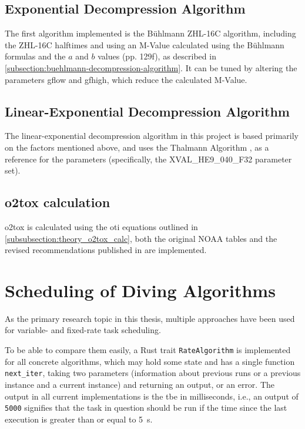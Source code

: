 \subsection{Exponential Decompression Algorithm}
The first algorithm implemented is the Bühlmann ZHL-16C algorithm, including the ZHL-16C halftimes and using an M-Value calculated using the Bühlmann formulas and the $a$ and $b$ values \cite{tauchmedizin-2002} (pp. 129f), as described in \ref{subsection:buehlmann-decompression-algorithm}.
It can be tuned by altering the parameters \gls{gflow} and \gls{gfhigh}, which reduce the calculated M-Value.

\subsection{Linear-Exponential Decompression Algorithm}
The linear-exponential decompression algorithm in this project is based primarily on the factors mentioned above, and uses the Thalmann Algorithm \cite{thalmann-tables-software-2010} \cite{thalmann-parameters-1.3-2020}, as a reference for the parameters (specifically, the XVAL\_HE9\_040\_F32 parameter set).

\subsection{\gls{o2tox} calculation}
\gls{o2tox} is calculated using the \gls{oti} equations outlined in \ref{subsubsection:theory_o2tox_calc}, both the original NOAA tables and the revised recommendations published in \cite{RevisedO2Tox2025} are implemented.

\section{Scheduling of Diving Algorithms}
As the primary research topic in this thesis, multiple approaches have been used for variable- and fixed-rate task scheduling. 

To be able to compare them easily, a Rust trait \lstinline{RateAlgorithm} is implemented for all concrete algorithms, which may hold some state and has a single function \lstinline{next_iter}, taking two parameters (information about previous runs or a previous instance and a current instance) and returning an output, or an error.
The output in all current implementations is the \gls{tbe} in milliseconds, i.e., an output of \lstinline{5000} signifies that the task in question should be run if the time since the last execution is greater than or equal to \SI{5}{\second}.

